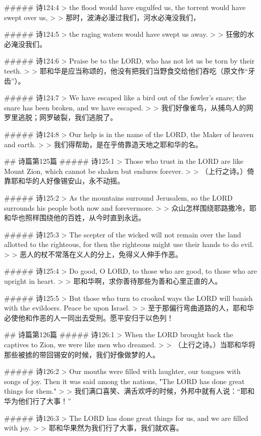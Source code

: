 ##### 诗124:4
> the flood would have engulfed us, the torrent would have swept over us,
>
> 那时，波涛必漫过我们，河水必淹没我们，


##### 诗124:5
> the raging waters would have swept us away.
>
> 狂傲的水必淹没我们。


##### 诗124:6
> Praise be to the LORD, who has not let us be torn by their teeth.
>
> 耶和华是应当称颂的，他没有把我们当野食交给他们吞吃（原文作“牙齿”）。


##### 诗124:7
> We have escaped like a bird out of the fowler's snare; the snare has been broken, and we have escaped.
>
> 我们好像雀鸟，从捕鸟人的网罗里逃脱；网罗破裂，我们逃脱了。


##### 诗124:8
> Our help is in the name of the LORD, the Maker of heaven and earth.
>
> 我们得帮助，是在乎倚靠造天地之耶和华的名。


## 诗篇第125篇
##### 诗125:1
> Those who trust in the LORD are like Mount Zion, which cannot be shaken but endures forever.
>
> （上行之诗。）倚靠耶和华的人好像锡安山，永不动摇。


##### 诗125:2
> As the mountains surround Jerusalem, so the LORD surrounds his people both now and forevermore.
>
> 众山怎样围绕耶路撒冷，耶和华也照样围绕他的百姓，从今时直到永远。


##### 诗125:3
> The scepter of the wicked will not remain over the land allotted to the righteous, for then the righteous might use their hands to do evil.
>
> 恶人的杖不常落在义人的分上，免得义人伸手作恶。


##### 诗125:4
> Do good, O LORD, to those who are good, to those who are upright in heart.
>
> 耶和华啊，求你善待那些为善和心里正直的人。


##### 诗125:5
> But those who turn to crooked ways the LORD will banish with the evildoers. Peace be upon Israel.
>
> 至于那偏行弯曲道路的人，耶和华必使他和作恶的人一同出去受刑。愿平安归于以色列！


## 诗篇第126篇
##### 诗126:1
> When the LORD brought back the captives to Zion, we were like men who dreamed.
>
> （上行之诗。）当耶和华将那些被掳的带回锡安的时候，我们好像做梦的人。


##### 诗126:2
> Our mouths were filled with laughter, our tongues with songs of joy. Then it was said among the nations, "The LORD has done great things for them."
>
> 我们满口喜笑、满舌欢呼的时候，外邦中就有人说：“耶和华为他们行了大事！”


##### 诗126:3
> The LORD has done great things for us, and we are filled with joy.
>
> 耶和华果然为我们行了大事，我们就欢喜。


